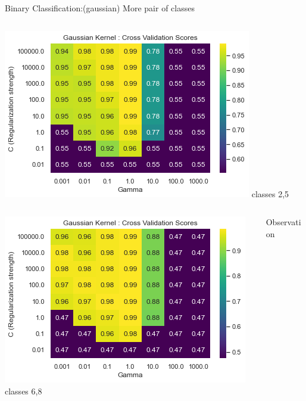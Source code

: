 \documentclass[12pt,t]{beamer}
\begin{document}
\begin{frame}[t]{Binary Classification:(gaussian) More pair of classes}
\begin{columns}
\begin{column}[]{0.33\linewidth}
            \includegraphics[width=\linewidth]{images/p1a/2(binary clf)/classes2and5_libsvm_rbf25f.png}
            \centering classes 2,5
        \end{column}
    \end{columns}
    
    \vspace{10pt}

    \begin{columns}
        \begin{column}[T]{0.33\linewidth}
            \includegraphics[width=\linewidth]{images/p1a/2(binary clf)/classes6and8_libsvm_rbf25f.png}
            \centering classes 6,8
        \end{column}
        \begin{column}[T]{0.66\linewidth}
            \begin{block}{Observation}
                \begin{enumerate}
                    

\end{enumerate}
\end{block}
\end{column}
\end{columns}
\end{frame}
\end{document}
